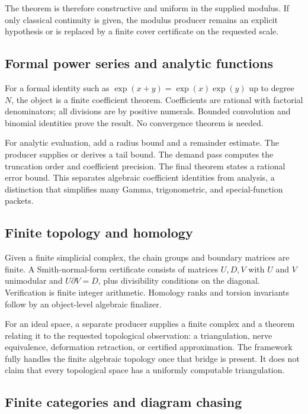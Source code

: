 The theorem is therefore constructive and uniform in the supplied modulus.  If
only classical continuity is given, the modulus producer remains an explicit
hypothesis or is replaced by a finite cover certificate on the requested
scale.

\subsection{Formal power series and analytic functions}

For a formal identity such as
\(\exp(x+y)=\exp(x)\exp(y)\) up to degree \(N\), the object is a finite
coefficient theorem.  Coefficients are rational with factorial denominators;
all divisions are by positive numerals.  Bounded convolution and binomial
identities prove the result.  No convergence theorem is needed.

For analytic evaluation, add a radius bound and a remainder estimate.  The
producer supplies or derives a tail bound.  The demand pass computes the
truncation order and coefficient precision.  The final theorem states a
rational error bound.  This separates algebraic coefficient identities from
analysis, a distinction that simplifies many Gamma, trigonometric, and
special-function packets.

\subsection{Finite topology and homology}

Given a finite simplicial complex, the chain groups and boundary matrices are
finite.  A Smith-normal-form certificate consists of matrices \(U,D,V\) with
\(U\) and \(V\) unimodular and
\(U\partial V=D\), plus divisibility conditions on the diagonal.  Verification
is finite integer arithmetic.  Homology ranks and torsion invariants follow by
an object-level algebraic finalizer.

For an ideal space, a separate producer supplies a finite complex and a theorem
relating it to the requested topological observation: a triangulation,
nerve equivalence, deformation retraction, or certified approximation.  The
framework fully handles the finite algebraic topology once that bridge is
present.  It does not claim that every topological space has a uniformly
computable triangulation.

\subsection{Finite categories and diagram chasing}

